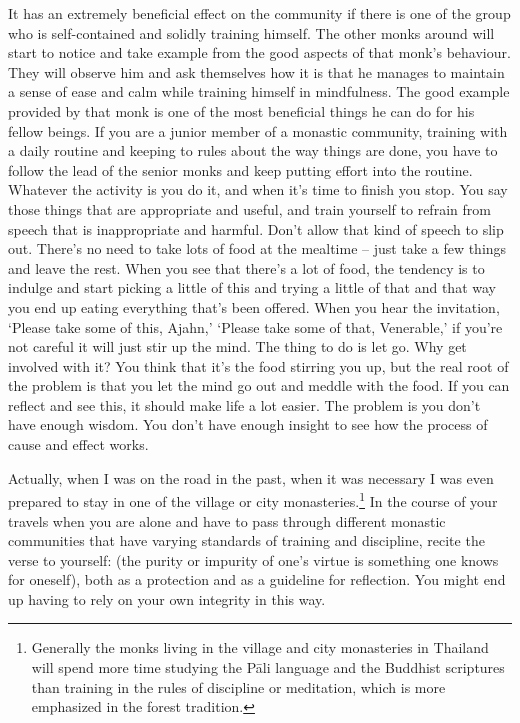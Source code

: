 It has an extremely beneficial effect on the community if there is one of the group who is self-contained and solidly training himself. The other monks around will start to notice and take example from the good aspects of that monk's behaviour. They will observe him and ask themselves how it is that he manages to maintain a sense of ease and calm while training himself in mindfulness. The good example provided by that monk is one of the most beneficial things he can do for his fellow beings. If you are a junior member of a monastic community, training with a daily routine and keeping to rules about the way things are done, you have to follow the lead of the senior monks and keep putting effort into the routine. Whatever the activity is you do it, and when it's time to finish you stop. You say those things that are appropriate and useful, and train yourself to refrain from speech that is inappropriate and harmful. Don't allow that kind of speech to slip out. There's no need to take lots of food at the mealtime -- just take a few things and leave the rest. When you see that there's a lot of food, the tendency is to indulge and start picking a little of this and trying a little of that and that way you end up eating everything that's been offered. When you hear the invitation, `Please take some of this, Ajahn,' `Please take some of that, Venerable,' if you're not careful it will just stir up the mind. The thing to do is let go. Why get involved with it? You think that it's the food stirring you up, but the real root of the problem is that you let the mind go out and meddle with the food. If you can reflect and see this, it should make life a lot easier. The problem is you don't have enough wisdom. You don't have enough insight to see how the process of cause and effect works.

Actually, when I was on the road in the past, when it was necessary I was even prepared to stay in one of the village or city monasteries.\footnote{Generally the monks living in the village and city monasteries in Thailand will spend more time studying the P\=ali language and the Buddhist scriptures than training in the rules of discipline or meditation, which is more emphasized in the forest tradition.} In the course of your travels when you are alone and have to pass through different monastic communities that have varying standards of training and discipline, recite the verse to yourself:  (the purity or impurity of one's virtue is something one knows for oneself), both as a protection and as a guideline for reflection. You might end up having to rely on your own integrity in this way. 

